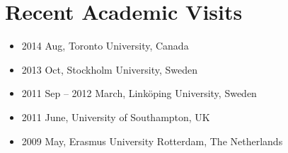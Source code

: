 \documentclass[twoside,a4paper,11pt]{amsart}
\begin{document}
\section*{Recent Academic Visits}

\begin{itemize}
\item 2014 Aug, Toronto University, Canada
\item 2013 Oct, Stockholm University, Sweden
\item 2011 Sep – 2012 March, Linköping University, Sweden
\item 2011 June, University of Southampton, UK
\item 2009 May, Erasmus University Rotterdam, The Netherlands
\end{itemize}





\end{document}
